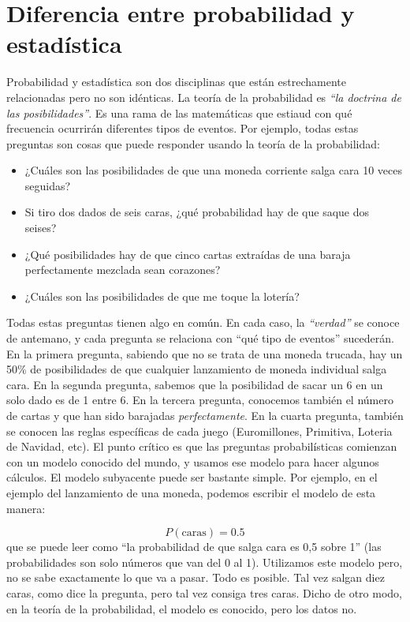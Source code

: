 \documentclass[
]{book}
\providecommand{\tightlist}{%
  \setlength{\itemsep}{0pt}\setlength{\parskip}{0pt}}
\begin{document}
\hypertarget{diferencia-entre-probabilidad-y-estaduxedstica}{%
\section{Diferencia entre probabilidad y estadística}\label{diferencia-entre-probabilidad-y-estaduxedstica}}

Probabilidad y estadística son dos disciplinas que están estrechamente relacionadas pero no son idénticas. La teoría de la probabilidad es \emph{``la doctrina de las posibilidades''}. Es una rama de las matemáticas que estiaud con qué frecuencia ocurrirán diferentes tipos de eventos. Por ejemplo, todas estas preguntas son cosas que puede responder usando la teoría de la probabilidad:

\begin{itemize}
\tightlist
\item
  ¿Cuáles son las posibilidades de que una moneda corriente salga cara 10 veces seguidas?
\item
  Si tiro dos dados de seis caras, ¿qué probabilidad hay de que saque dos seises?
\item
  ¿Qué posibilidades hay de que cinco cartas extraídas de una baraja perfectamente mezclada sean corazones?
\item
  ¿Cuáles son las posibilidades de que me toque la lotería?
\end{itemize}

Todas estas preguntas tienen algo en común. En cada caso, la \emph{``verdad''} se conoce de antemano, y cada pregunta se relaciona con ``qué tipo de eventos'' sucederán. En la primera pregunta, sabiendo que no se trata de una moneda trucada, hay un 50\% de posibilidades de que cualquier lanzamiento de moneda individual salga cara. En la segunda pregunta, sabemos que la posibilidad de sacar un 6 en un solo dado es de 1 entre 6. En la tercera pregunta, conocemos también el número de cartas y que han sido barajadas \emph{perfectamente}. En la cuarta pregunta, también se conocen las reglas específicas de cada juego (Euromillones, Primitiva, Loteria de Navidad, etc). El punto crítico es que las preguntas probabilísticas comienzan con un modelo conocido del mundo, y usamos ese modelo para hacer algunos cálculos. El modelo subyacente puede ser bastante simple. Por ejemplo, en el ejemplo del lanzamiento de una moneda, podemos escribir el modelo de esta manera:

\[
P(\mbox{caras}) = 0.5
\]
que se puede leer como ``la probabilidad de que salga cara es 0,5 sobre 1'' (las probabilidades son solo números que van del 0 al 1). Utilizamos este modelo pero, no se sabe exactamente lo que va a pasar. Todo es posible. Tal vez salgan diez caras, como dice la pregunta, pero tal vez consiga tres caras. Dicho de otro modo, en la teoría de la probabilidad, el modelo es conocido, pero los datos no.
\end{document}
